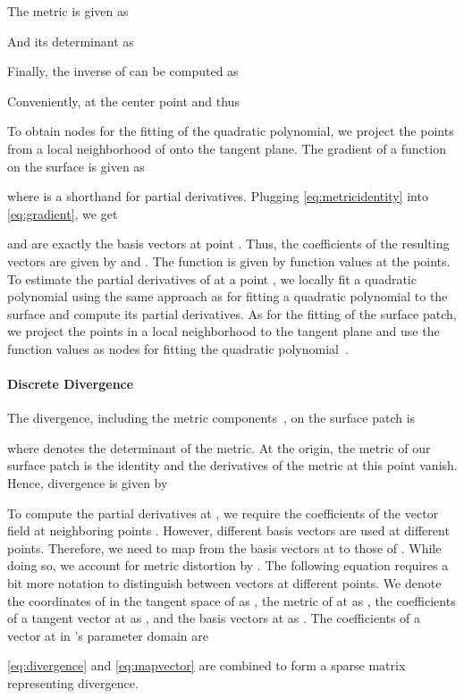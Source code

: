 \documentclass[acmtog, authorversion]{acmart}
\begin{document}
The metric is given as

And its determinant as

Finally, the inverse of  can be computed as

Conveniently, at the center point  and thus

To obtain nodes for the fitting of the quadratic polynomial, we project the points from a local neighborhood of  onto the tangent plane.
The gradient of a function  on the surface is given as

where  is a shorthand for partial derivatives. Plugging \autoref{eq:metricidentity} into \autoref{eq:gradient}, we get

 and  are exactly the basis vectors at point . Thus, the coefficients of the resulting vectors are given by  and .
The function  is given by function values at the points. 
To estimate the partial derivatives of  at a point , we locally fit a quadratic polynomial using the same approach as for fitting a quadratic polynomial to the surface and compute its partial derivatives. 
As for the fitting of the surface patch, we project the points in a local neighborhood to the tangent plane and use the function values as nodes for fitting the quadratic polynomial~\cite{Nealen2004}.


\paragraph{Discrete Divergence}
The divergence, including the metric components~\cite{o1983semi}, on the surface patch  is 

where  denotes the determinant of the metric.
At the origin, the metric of our surface patch is the identity and the derivatives of the metric at this point vanish. Hence, divergence is given by 


To compute the partial derivatives  at , we require the coefficients of the vector field at neighboring points . However, different basis vectors are used at different points. Therefore, we need to map from the basis vectors at  to those of . While doing so, we account for metric distortion by . The following equation requires a bit more notation to distinguish between vectors at different points. We denote the coordinates of  in the tangent space of  as , the metric of  at  as , the coefficients of a tangent vector at  as , and the basis vectors at  as . The coefficients of a vector at  in 's parameter domain are

\autoref{eq:divergence} and \autoref{eq:mapvector} are combined to form a sparse matrix  representing divergence.
\end{document}
